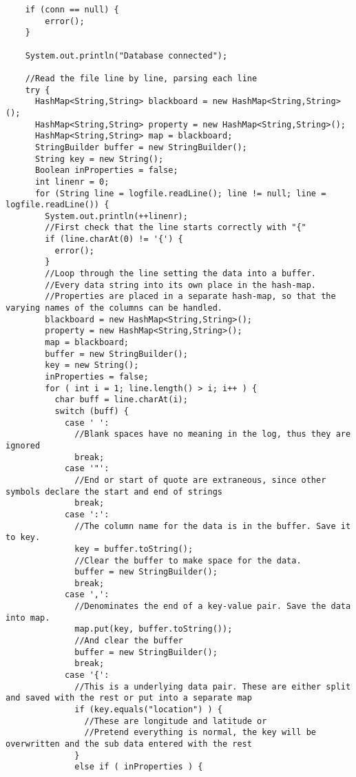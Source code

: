 \begin{lstlisting}
    if (conn == null) {
        error();
    }

    System.out.println("Database connected");
	
    //Read the file line by line, parsing each line
    try {
      HashMap<String,String> blackboard = new HashMap<String,String>();
      HashMap<String,String> property = new HashMap<String,String>();
      HashMap<String,String> map = blackboard;
      StringBuilder buffer = new StringBuilder();
      String key = new String();
      Boolean inProperties = false;
      int linenr = 0;
      for (String line = logfile.readLine(); line != null; line = logfile.readLine()) {
        System.out.println(++linenr);
        //First check that the line starts correctly with "{"
        if (line.charAt(0) != '{') {
          error();
        }
        //Loop through the line setting the data into a buffer.
        //Every data string into its own place in the hash-map.
        //Properties are placed in a separate hash-map, so that the varying names of the columns can be handled.
        blackboard = new HashMap<String,String>();
        property = new HashMap<String,String>();
        map = blackboard;
        buffer = new StringBuilder();
        key = new String();
        inProperties = false;
        for ( int i = 1; line.length() > i; i++ ) {
          char buff = line.charAt(i);
          switch (buff) {
            case ' ':
              //Blank spaces have no meaning in the log, thus they are ignored
              break;
            case '"':
              //End or start of quote are extraneous, since other symbols declare the start and end of strings
              break;
            case ':':
              //The column name for the data is in the buffer. Save it to key.
              key = buffer.toString();
              //Clear the buffer to make space for the data.
              buffer = new StringBuilder();
              break;
            case ',':
              //Denominates the end of a key-value pair. Save the data into map.
              map.put(key, buffer.toString());
              //And clear the buffer
              buffer = new StringBuilder();
              break;
            case '{':
              //This is a underlying data pair. These are either split and saved with the rest or put into a separate map
              if (key.equals("location") ) {
                //These are longitude and latitude or 
                //Pretend everything is normal, the key will be overwritten and the sub data entered with the rest
              }
              else if ( inProperties ) {

\end{lstlisting}
